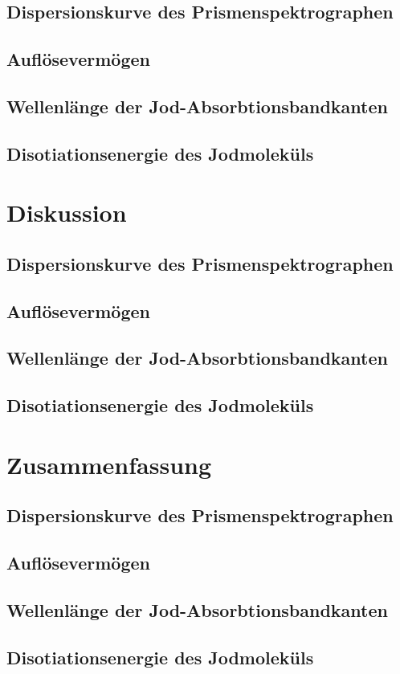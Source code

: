 \documentclass[12pt,english,ngerman]{scrartcl}
\begin{document}
\subsection{Dispersionskurve des Prismenspektrographen}


\subsection{Auflösevermögen}


\subsection{Wellenlänge der Jod-Absorbtionsbandkanten}


\subsection{Disotiationsenergie des Jodmoleküls}


\section{Diskussion}\label{sec:disk}


\subsection{Dispersionskurve des Prismenspektrographen}


\subsection{Auflösevermögen}


\subsection{Wellenlänge der Jod-Absorbtionsbandkanten}


\subsection{Disotiationsenergie des Jodmoleküls}


\section{Zusammenfassung}\label{sec:zs}


\subsection{Dispersionskurve des Prismenspektrographen}


\subsection{Auflösevermögen}


\subsection{Wellenlänge der Jod-Absorbtionsbandkanten}


\subsection{Disotiationsenergie des Jodmoleküls}
\end{document}
